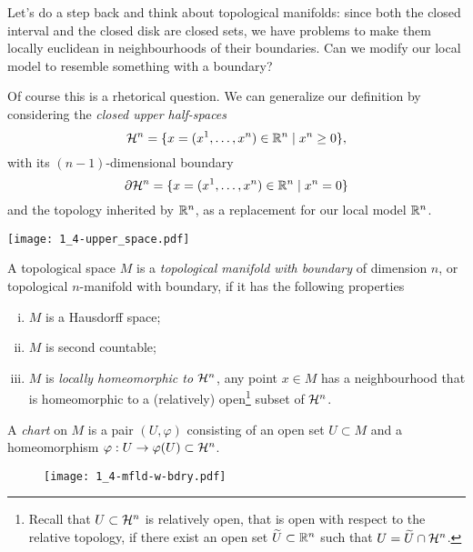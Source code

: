 Let's do a step back and think about topological manifolds: since both the closed interval and the closed disk are closed sets, we have problems to make them locally euclidean in neighbourhoods of their boundaries.
Can we modify our local model to resemble something with a boundary?

Of course this is a rhetorical question.
We can generalize our definition by considering the \emph{closed upper half-spaces}
\begin{equation}
	\mathcal{H}^n = \{x=(x^1, \ldots, x^n)\in\mathbb{R}^n\mid x^n \geq 0\},
\end{equation}
with its $(n-1)$-dimensional boundary
\begin{equation}
	\partial\mathcal{H}^n = \{x=(x^1, \ldots, x^n)\in\mathbb{R}^n\mid x^n = 0\}
\end{equation}
and the topology inherited by $\mathbb{R}^n$, as a replacement for our local model $\mathbb{R}^n$.
%
\begin{marginfigure}
	\texttt{[image: 1\_4-upper\_space.pdf]}
\end{marginfigure}

\begin{definition}
	A topological space $M$ is a \emph{topological manifold with boundary} of dimension $n$, or topological $n$-manifold with boundary, if it has the following properties
	\begin{enumerate}[(i)]
		\item $M$ is a Hausdorff space;
		\item $M$ is second countable;
		\item $M$ is \emph{locally homeomorphic to $\mathcal{H}^n$}, any point $x\in M$ has a neighbourhood that is homeomorphic to a (relatively) open\footnote{Recall that $U\subset\mathcal{H}^n$ is relatively open, that is open with respect to the relative topology, if there exist an open set $\widetilde U\subset\mathbb{R}^n$ such that $U = \widetilde U \cap \mathcal{H}^n$.} subset of $\mathcal{H}^n$.
	\end{enumerate}

	A \emph{chart} on $M$ is a pair $(U, \varphi)$ consisting of an open set $U\subset M$ and a homeomorphism $\varphi: U \to \varphi(U)\subset \mathcal{H}^n$.
\end{definition}

\begin{figure}
	\texttt{[image: 1\_4-mfld-w-bdry.pdf]}
\end{figure}

